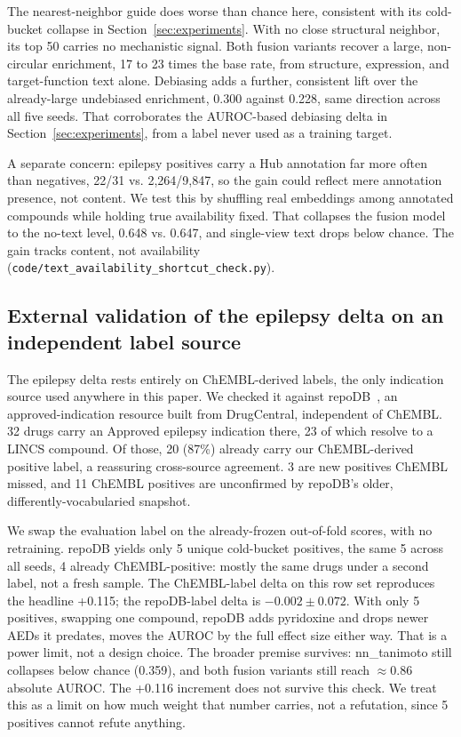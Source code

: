 \documentclass{llncs}
\begin{document}
The nearest-neighbor guide does worse than chance here, consistent with its cold-bucket collapse in Section~\ref{sec:experiments}. With no close structural neighbor, its top 50 carries no mechanistic signal. Both fusion variants recover a large, non-circular enrichment, 17 to 23 times the base rate, from structure, expression, and target-function text alone. Debiasing adds a further, consistent lift over the already-large undebiased enrichment, 0.300 against 0.228, same direction across all five seeds. That corroborates the AUROC-based debiasing delta in Section~\ref{sec:experiments}, from a label never used as a training target.

A separate concern: epilepsy positives carry a Hub annotation far more often than negatives, 22/31 vs. 2{,}264/9{,}847, so the gain could reflect mere annotation presence, not content. We test this by shuffling real embeddings among annotated compounds while holding true availability fixed. That collapses the fusion model to the no-text level, 0.648 vs. 0.647, and single-view text drops below chance. The gain tracks content, not availability (\texttt{code/text\_availability\_shortcut\_check.py}).

\subsection{External validation of the epilepsy delta on an independent label source}
\label{sec:repodb}
The epilepsy delta rests entirely on ChEMBL-derived labels, the only indication source used anywhere in this paper. We checked it against repoDB~\cite{brown2017repodb}, an approved-indication resource built from DrugCentral, independent of ChEMBL. 32 drugs carry an Approved epilepsy indication there, 23 of which resolve to a LINCS compound. Of those, 20 (87\%) already carry our ChEMBL-derived positive label, a reassuring cross-source agreement. 3 are new positives ChEMBL missed, and 11 ChEMBL positives are unconfirmed by repoDB's older, differently-vocabularied snapshot.

We swap the evaluation label on the already-frozen out-of-fold scores, with no retraining. repoDB yields only 5 unique cold-bucket positives, the same 5 across all seeds, 4 already ChEMBL-positive: mostly the same drugs under a second label, not a fresh sample. The ChEMBL-label delta on this row set reproduces the headline +0.115; the repoDB-label delta is $-0.002 \pm 0.072$. With only 5 positives, swapping one compound, repoDB adds pyridoxine and drops newer AEDs it predates, moves the AUROC by the full effect size either way. That is a power limit, not a design choice. The broader premise survives: nn\_tanimoto still collapses below chance (0.359), and both fusion variants still reach $\approx$0.86 absolute AUROC. The +0.116 increment does not survive this check. We treat this as a limit on how much weight that number carries, not a refutation, since 5 positives cannot refute anything.
\end{document}

